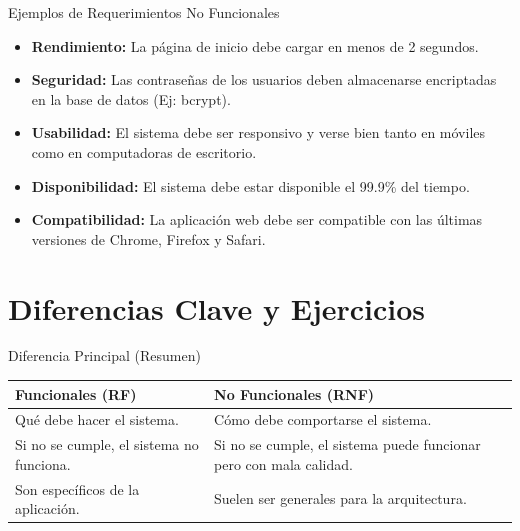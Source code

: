 \documentclass{beamer}
\begin{document}
\begin{frame}{Ejemplos de Requerimientos No Funcionales}
    \begin{itemize}
        \item \textbf{Rendimiento:} La página de inicio debe cargar en menos de 2 segundos.
        \item \textbf{Seguridad:} Las contraseñas de los usuarios deben almacenarse encriptadas en la base de datos (Ej: bcrypt).
        \item \textbf{Usabilidad:} El sistema debe ser responsivo y verse bien tanto en móviles como en computadoras de escritorio.
        \item \textbf{Disponibilidad:} El sistema debe estar disponible el 99.9\% del tiempo.
        \item \textbf{Compatibilidad:} La aplicación web debe ser compatible con las últimas versiones de Chrome, Firefox y Safari.
    \end{itemize}
\end{frame}

\section{Diferencias Clave y Ejercicios}

\begin{frame}{Diferencia Principal (Resumen)}
    \begin{center}
    \begin{tabular}{|p{5cm}|p{5cm}|}
    \hline
    \textbf{Funcionales (RF)} & \textbf{No Funcionales (RNF)} \\
    \hline
    Qué debe hacer el sistema. & Cómo debe comportarse el sistema. \\
    \hline
    Si no se cumple, el sistema no funciona. & Si no se cumple, el sistema puede funcionar pero con mala calidad. \\
    \hline
    Son específicos de la aplicación. & Suelen ser generales para la arquitectura. \\
    \hline
    \end{tabular}
    \end{center}
\end{frame}
\end{document}
